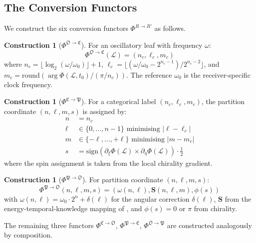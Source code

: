 \documentclass[11pt,twocolumn,a4paper]{article}
\theoremstyle{definition}
\newtheorem{construction}[theorem]{Construction}
\theoremstyle{remark}
\newcommand{\Scoord}{\mathbf{S}}
\newcommand{\Osc}{\mathfrak{O}}
\newcommand{\Cat}{\mathfrak{C}}
\newcommand{\Part}{\mathfrak{P}}
\newcommand{\Leaf}{\mathcal{L}}
\begin{document}
\subsection{The Conversion Functors}

We construct the six conversion functors $\Phi^{R \to R'}$ as follows.

\begin{construction}[$\Phi^{\Osc \to \Cat}$]
\label{cons:osc_cat}
For an oscillatory leaf with frequency $\omega$:
\begin{equation}
\Phi^{\Osc \to \Cat}(\Leaf) = (n_c, \ell_c, m_c)
\end{equation}
where $n_c = \lfloor \log_2(\omega / \omega_0) \rfloor + 1$, $\ell_c = \lfloor (\omega/\omega_0 - 2^{n_c - 1}) / 2^{n_c - 2} \rfloor$, and $m_c = \mathrm{round}(\arg \Phi(\Leaf, t_0) / (\pi/n_c))$. The reference $\omega_0$ is the receiver-specific clock frequency.
\end{construction}

\begin{construction}[$\Phi^{\Cat \to \Part}$]
\label{cons:cat_part}
For a categorical label $(n_c, \ell_c, m_c)$, the partition coordinate $(n, \ell, m, s)$ is assigned by:
\begin{align}
n &= n_c \\
\ell &\in \{0, \ldots, n-1\} \text{ minimising } |\ell - \ell_c| \\
m &\in \{-\ell, \ldots, +\ell\} \text{ minimising } |m - m_c| \\
s &= \mathrm{sign}(\partial_\xi \Phi(\Leaf) \times \partial_\eta \Phi(\Leaf)) \cdot \tfrac{1}{2}
\end{align}
where the spin assignment is taken from the local chirality gradient.
\end{construction}

\begin{construction}[$\Phi^{\Part \to \Osc}$]
\label{cons:part_osc}
For partition coordinate $(n, \ell, m, s)$:
\begin{equation}
\Phi^{\Part \to \Osc}(n, \ell, m, s) = (\omega(n, \ell), \Scoord(n, \ell, m), \phi(s))
\end{equation}
with $\omega(n, \ell) = \omega_0 \cdot 2^n + \delta(\ell)$ for the angular correction $\delta(\ell)$, $\Scoord$ from the energy-temporal-knowledge mapping of \citep{sachikonye2025_hyperfine}, and $\phi(s) = 0$ or $\pi$ from chirality.
\end{construction}

The remaining three functors $\Phi^{\Cat \to \Osc}$, $\Phi^{\Part \to \Cat}$, $\Phi^{\Osc \to \Part}$ are constructed analogously by composition.
\end{document}
